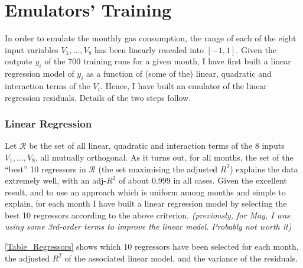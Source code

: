\documentclass[a4paper, 12pt]{article}
\begin{document}
\section{Emulators' Training}
In order to emulate the monthly gas consumption, the range of each of the eight input variables $V_1, \dots, V_8$ has been linearly rescaled into $[-1,1]$.
Given the outputs $y_i$ of the 700 training runs for a given month, 
I have first built a linear regression model of $y_i$ as a function of (some of the) linear, quadratic and interaction terms of the $V_i$.
Hence, I have built an emulator of the linear regression residuals. Details of the two steps follow.

\subsubsection*{Linear Regression}
Let $\mathcal{R}$ be the set of all linear, quadratic and interaction terms of the 8 inputs $V_1, \dots, V_8$, all mutually orthogonal.
As it turns out, for all months, the set of the ``best'' 10 regressors in $\mathcal{R}$ (the set maximising the adjusted $R^2$) explains the data extremely well, 
with an adj-$R^2$ of about 0.999 in all cases. Given the excellent result, and to use an approach which is uniform among months and simple to explain,  
for each month I have built a linear regression model by selecting the best 10 regressors according to the above criterion. 
\emph{(previously, for May, I was using some 3rd-order terms to improve the linear model. Probably not worth it)}

\autoref{Table_Regressors} shows which 10 regressors have been selected for each month, the adjusted $R^2$ of the associated linear model, and the variance of the residuals.
\end{document}
